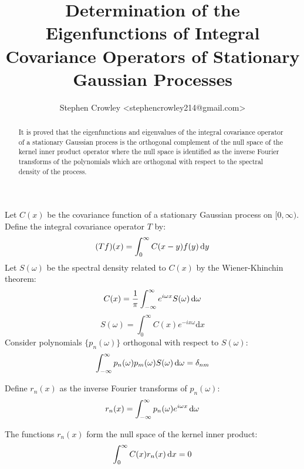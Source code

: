\documentclass{article}
\title{Determination of the Eigenfunctions of Integral Covariance Operators of
Stationary Gaussian Processes}
\author{
  Stephen Crowley <stephencrowley214@gmail.com>
  \tmaffiliation{September 14, 2024}
}
\newcommand{\mathd}{\mathrm{d}}
\begin{document}
\maketitle

\begin{abstract}
  It is proved that the eigenfunctions and eigenvalues of the integral
  covariance operator of a stationary Gaussian process is the orthogonal
  complement of the null space of the kernel inner product operator where the
  null space is identified as the inverse Fourier transforms of the
  polynomials which are orthogonal with respect to the spectral density of the
  process. 
\end{abstract}

Let $C (x)$ be the covariance function of a stationary Gaussian process on
$[0, \infty)$. Define the integral covariance operator $T$ by:
\begin{equation}
  (Tf) (x) = \int_0^{\infty} C (x - y) f (y)  \hspace{0.17em} \mathd y
\end{equation}
Let $S (\omega)$ be the spectral density related to $C (x)$ by the Wiener-Khinchin theorem:
\begin{equation}
  C (x) = \frac{1}{\pi} \int_{-\infty}^{\infty} e^{i \omega x} S (\omega) 
  \hspace{0.17em} \mathd \omega
\end{equation}
\begin{equation}
  S (\omega) = \int_{0}^{\infty} C (x) e^{-i x \omega} \mathd x
\end{equation}
Consider polynomials $\{p_n (\omega)\}$ orthogonal with respect to $S
(\omega)$:
\begin{equation}
  \int_{-\infty}^{\infty} p_n (\omega) p_m (\omega) S (\omega)  \hspace{0.17em} \mathd
  \omega = \delta_{nm}
\end{equation}

Define $r_n (x)$ as the inverse Fourier transforms of $p_n (\omega)$:
\begin{equation}
  r_n (x) = \int_{-\infty}^{\infty} p_n (\omega) e^{i \omega x}  \hspace{0.17em} \mathd \omega
\end{equation}
\begin{lemma}
  The functions $r_n (x)$ form the null space of the kernel inner product:
  \begin{equation}
    \int_0^{\infty} C (x) r_n (x)  \hspace{0.17em} \mathd x = 0
  \end{equation}
\end{lemma}
\end{document}
